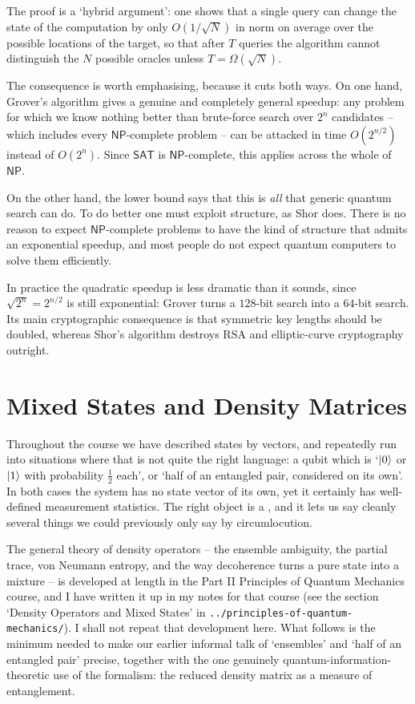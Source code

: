 \documentclass[a4paper]{scrartcl}
\newcommand{\class}[1]{\mathsf{#1}}
\begin{document}
The proof is a `hybrid argument': one shows that a single query can change the state of the computation by only $O(1/\sqrt N)$ in norm on average over the possible locations of the target, so that after $T$ queries the algorithm cannot distinguish the $N$ possible oracles unless $T = \Omega(\sqrt N)$.

The consequence is worth emphasising, because it cuts both ways. On one hand, Grover's algorithm gives a genuine and completely general speedup: any problem for which we know nothing better than brute-force search over $2^n$ candidates -- which includes every $\class{NP}$-complete problem -- can be attacked in time $O(2^{n/2})$ instead of $O(2^n)$. Since $\mathsf{SAT}$ is $\class{NP}$-complete, this applies across the whole of $\class{NP}$.

On the other hand, the lower bound says that this is \emph{all} that generic quantum search can do. To do better one must exploit structure, as Shor does. There is no reason to expect $\class{NP}$-complete problems to have the kind of structure that admits an exponential speedup, and most people do not expect quantum computers to solve them efficiently.

\begin{remark}
	In practice the quadratic speedup is less dramatic than it sounds, since $\sqrt{2^n} = 2^{n/2}$ is still exponential: Grover turns a $128$-bit search into a $64$-bit search. Its main cryptographic consequence is that symmetric key lengths should be doubled, whereas Shor's algorithm destroys RSA and elliptic-curve cryptography outright.
\end{remark}

\section{Mixed States and Density Matrices}

Throughout the course we have described states by vectors, and repeatedly run into situations where that is not quite the right language: a qubit which is `$\ket0$ or $\ket1$ with probability $\tfrac12$ each', or `half of an entangled pair, considered on its own'. In both cases the system has no state vector of its own, yet it certainly has well-defined measurement statistics. The right object is a , and it lets us say cleanly several things we could previously only say by circumlocution.

The general theory of density operators -- the ensemble ambiguity, the partial trace, von Neumann entropy, and the way decoherence turns a pure state into a mixture -- is developed at length in the Part II Principles of Quantum Mechanics course, and I have written it up in my notes for that course (see the section `Density Operators and Mixed States' in \texttt{../principles-of-quantum-mechanics/}). I shall not repeat that development here. What follows is the minimum needed to make our earlier informal talk of `ensembles' and `half of an entangled pair' precise, together with the one genuinely quantum-information-theoretic use of the formalism: the reduced density matrix as a measure of entanglement.
\end{document}

